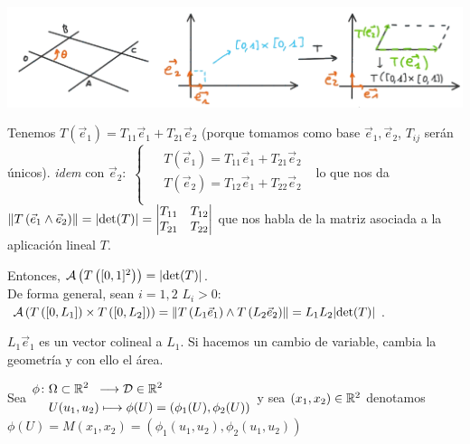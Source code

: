 \documentclass{report}
\begin{document}
    \begin{center}
      \includegraphics[width=\textwidth]{cambioVar.png}
    \end{center}

    \noindent Tenemos $T\left(\vec{e}_1\right)=T_{11}\vec{e}_1+T_{21}\vec{e}_2$ (porque tomamos como base $\vec{e}_1,\vec{e}_2$, $T_{ij}$ serán únicos). \textit{idem} con $\vec{e}_2\colon$
    $\begin{cases}
      \begin{aligned}
        &T\left(\vec{e}_1\right) = T_{11}\vec{e}_1+T_{21}\vec{e}_2 \\
        &T\left(\vec{e}_2\right) = T_{12}\vec{e}_1+T_{22}\vec{e}_2 \\
      \end{aligned}      
    \end{cases}$ lo que nos da $\lVert T\left(\vec{e}_1\wedge\vec{e}_2\right)\rVert=\lvert\text{det}(T)\rvert=
    \begin{vmatrix}
      T_{11} & T_{12} \\
      T_{21} & T_{22} \\
    \end{vmatrix}$ que nos habla de la matriz asociada a la aplicación lineal $T$.

    \noindent Entonces, $\mathcal{A}\left(T\left([0,1]^2\right)\right)=\lvert\text{det}(T)\rvert$.\\

    \noindent De forma general, sean $i=1,2$ $L_i>0$: $\mathcal{A}\left(T\left([0,L_1]\right)\times T\left([0,L_2]\right)\right)=
    \lVert T\left(L_1\vec{e}_1\right)\wedge T\left(L_2\vec{e}_2\right)\rVert=L_1L_2\lvert\text{det}(T)\rvert$. 
    
    \noindent $L_1\vec{e}_1$ es un vector colineal a $L_1$. Si hacemos un cambio de variable, cambia la geometría y con ello el área.

    \vspace{0.4cm}\noindent Sea 
    $\begin{aligned}
      \phi\colon &\Omega\subset\mathbb{R}^2\hspace{0.2cm}\longrightarrow\mathcal{D}\in\mathbb{R}^2\\
      &U(u_1,u_2)\longmapsto\phi(U)=\left(\phi_1(U),\phi_2(U)\right)\\
    \end{aligned}$ y sea $(x_1,x_2)\in\mathbb{R}^2$ denotamos $\phi(U)=M(x_1,x_2)=\left(\phi_1(u_1,u_2),\phi_2(u_1,u_2)\right)$
    
\end{document}

